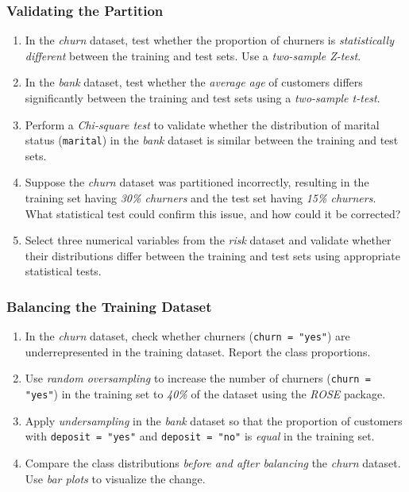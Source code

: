 \documentclass[
]{book}
\newcommand{\passthrough}[1]{#1}
\theoremstyle{definition}
\theoremstyle{definition}
\theoremstyle{definition}
\theoremstyle{definition}
\theoremstyle{remark}
\begin{document}
\subsubsection*{Validating the Partition}\label{validating-the-partition}

\begin{enumerate}
\def\labelenumi{\arabic{enumi}.}
\setcounter{enumi}{19}
\item
  In the \emph{churn} dataset, test whether the proportion of churners is \emph{statistically different} between the training and test sets. Use a \emph{two-sample Z-test}.
\item
  In the \emph{bank} dataset, test whether the \emph{average age} of customers differs significantly between the training and test sets using a \emph{two-sample t-test}.
\item
  Perform a \emph{Chi-square test} to validate whether the distribution of marital status (\passthrough{\lstinline!marital!}) in the \emph{bank} dataset is similar between the training and test sets.
\item
  Suppose the \emph{churn} dataset was partitioned incorrectly, resulting in the training set having \emph{30\% churners} and the test set having \emph{15\% churners}. What statistical test could confirm this issue, and how could it be corrected?
\item
  Select three numerical variables from the \emph{risk} dataset and validate whether their distributions differ between the training and test sets using appropriate statistical tests.
\end{enumerate}

\subsubsection*{Balancing the Training Dataset}\label{balancing-the-training-dataset-1}

\begin{enumerate}
\def\labelenumi{\arabic{enumi}.}
\setcounter{enumi}{24}
\item
  In the \emph{churn} dataset, check whether churners (\passthrough{\lstinline!churn = "yes"!}) are underrepresented in the training dataset. Report the class proportions.
\item
  Use \emph{random oversampling} to increase the number of churners (\passthrough{\lstinline!churn = "yes"!}) in the training set to \emph{40\%} of the dataset using the \emph{ROSE} package.
\item
  Apply \emph{undersampling} in the \emph{bank} dataset so that the proportion of customers with \passthrough{\lstinline!deposit = "yes"!} and \passthrough{\lstinline!deposit = "no"!} is \emph{equal} in the training set.
\item
  Compare the class distributions \emph{before and after balancing} the \emph{churn} dataset. Use \emph{bar plots} to visualize the change.
\end{enumerate}
\end{document}
